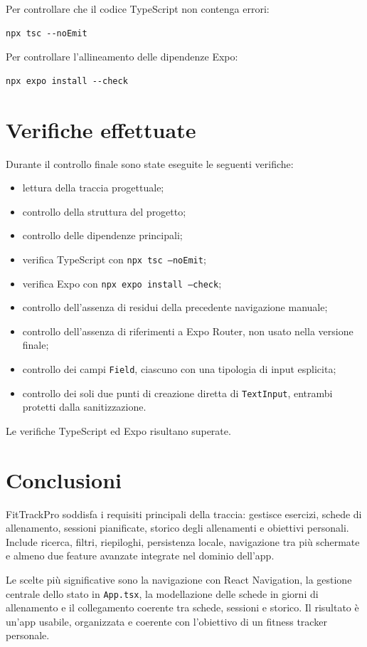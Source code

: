 \documentclass[11pt,a4paper]{article}
\begin{document}
Per controllare che il codice TypeScript non contenga errori:

\begin{lstlisting}
npx tsc --noEmit
\end{lstlisting}

Per controllare l'allineamento delle dipendenze Expo:

\begin{lstlisting}
npx expo install --check
\end{lstlisting}

\section{Verifiche effettuate}

Durante il controllo finale sono state eseguite le seguenti verifiche:

\begin{itemize}
  \item lettura della traccia progettuale;
  \item controllo della struttura del progetto;
  \item controllo delle dipendenze principali;
  \item verifica TypeScript con \texttt{npx tsc --noEmit};
  \item verifica Expo con \texttt{npx expo install --check};
  \item controllo dell'assenza di residui della precedente navigazione manuale;
  \item controllo dell'assenza di riferimenti a Expo Router, non usato nella versione finale;
  \item controllo dei campi \texttt{Field}, ciascuno con una tipologia di input esplicita;
  \item controllo dei soli due punti di creazione diretta di \texttt{TextInput}, entrambi protetti dalla sanitizzazione.
\end{itemize}

Le verifiche TypeScript ed Expo risultano superate.

\section{Conclusioni}

FitTrackPro soddisfa i requisiti principali della traccia: gestisce esercizi, schede di allenamento, sessioni pianificate, storico degli allenamenti e obiettivi personali. Include ricerca, filtri, riepiloghi, persistenza locale, navigazione tra più schermate e almeno due feature avanzate integrate nel dominio dell'app.

Le scelte più significative sono la navigazione con React Navigation, la gestione centrale dello stato in \texttt{App.tsx}, la modellazione delle schede in giorni di allenamento e il collegamento coerente tra schede, sessioni e storico. Il risultato è un'app usabile, organizzata e coerente con l'obiettivo di un fitness tracker personale.
\end{document}
